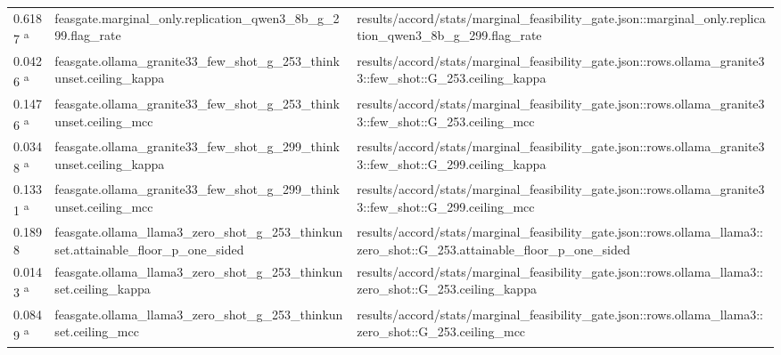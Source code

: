 \begin{longtable}{@{}p{0.7in}p{1.9in}p{2.6in}@{}}
0.6187 \textsuperscript{a} & feasgate.\allowbreak{}marginal\_only.\allowbreak{}replication\_qwen3\_8b\_g\_299.\allowbreak{}flag\_rate & results/\allowbreak{}accord/\allowbreak{}stats/\allowbreak{}marginal\_feasibility\_gate.\allowbreak{}json::marginal\_only.\allowbreak{}replication\_qwen3\_8b\_g\_299.\allowbreak{}flag\_rate\\
0.0426 \textsuperscript{a} & feasgate.\allowbreak{}ollama\_granite33\_few\_shot\_g\_253\_thinkunset.\allowbreak{}ceiling\_kappa & results/\allowbreak{}accord/\allowbreak{}stats/\allowbreak{}marginal\_feasibility\_gate.\allowbreak{}json::rows.\allowbreak{}ollama\_granite33::few\_shot::G\_253.\allowbreak{}ceiling\_kappa\\
0.1476 \textsuperscript{a} & feasgate.\allowbreak{}ollama\_granite33\_few\_shot\_g\_253\_thinkunset.\allowbreak{}ceiling\_mcc & results/\allowbreak{}accord/\allowbreak{}stats/\allowbreak{}marginal\_feasibility\_gate.\allowbreak{}json::rows.\allowbreak{}ollama\_granite33::few\_shot::G\_253.\allowbreak{}ceiling\_mcc\\
0.0348 \textsuperscript{a} & feasgate.\allowbreak{}ollama\_granite33\_few\_shot\_g\_299\_thinkunset.\allowbreak{}ceiling\_kappa & results/\allowbreak{}accord/\allowbreak{}stats/\allowbreak{}marginal\_feasibility\_gate.\allowbreak{}json::rows.\allowbreak{}ollama\_granite33::few\_shot::G\_299.\allowbreak{}ceiling\_kappa\\
0.1331 \textsuperscript{a} & feasgate.\allowbreak{}ollama\_granite33\_few\_shot\_g\_299\_thinkunset.\allowbreak{}ceiling\_mcc & results/\allowbreak{}accord/\allowbreak{}stats/\allowbreak{}marginal\_feasibility\_gate.\allowbreak{}json::rows.\allowbreak{}ollama\_granite33::few\_shot::G\_299.\allowbreak{}ceiling\_mcc\\
0.1898 & feasgate.\allowbreak{}ollama\_llama3\_zero\_shot\_g\_253\_thinkunset.\allowbreak{}attainable\_floor\_p\_one\_sided & results/\allowbreak{}accord/\allowbreak{}stats/\allowbreak{}marginal\_feasibility\_gate.\allowbreak{}json::rows.\allowbreak{}ollama\_llama3::zero\_shot::G\_253.\allowbreak{}attainable\_floor\_p\_one\_sided\\
0.0143 \textsuperscript{a} & feasgate.\allowbreak{}ollama\_llama3\_zero\_shot\_g\_253\_thinkunset.\allowbreak{}ceiling\_kappa & results/\allowbreak{}accord/\allowbreak{}stats/\allowbreak{}marginal\_feasibility\_gate.\allowbreak{}json::rows.\allowbreak{}ollama\_llama3::zero\_shot::G\_253.\allowbreak{}ceiling\_kappa\\
0.0849 \textsuperscript{a} & feasgate.\allowbreak{}ollama\_llama3\_zero\_shot\_g\_253\_thinkunset.\allowbreak{}ceiling\_mcc & results/\allowbreak{}accord/\allowbreak{}stats/\allowbreak{}marginal\_feasibility\_gate.\allowbreak{}json::rows.\allowbreak{}ollama\_llama3::zero\_shot::G\_253.\allowbreak{}ceiling\_mcc\\

\end{longtable}
